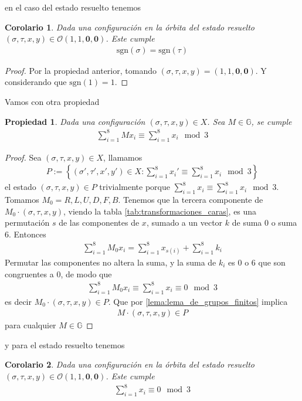 \documentclass{article}
\newtheorem{propiedad}{Propiedad}[section]
\newtheorem{corolario}{Corolario}[section]
\theoremstyle{definition}
\newcommand{\G}{\mathbb{G}}
\newcommand{\sgn}[1]{\text{sgn}\left(#1\right)}
\begin{document}
en el caso del estado resuelto tenemos
\begin{corolario}
    Dada una configuración en la órbita del estado resuelto $(\sigma,\tau,x,y)\in \mathcal{O}(1,1,\mathbf{0},\mathbf{0})$. Este cumple
    \begin{align*}
        \sgn{\sigma}=\sgn{\tau}
    \end{align*}
\end{corolario}
\begin{proof}
    Por la propiedad anterior, tomando $(\sigma,\tau,x,y)=(1,1,\mathbf{0},\mathbf{0})$. Y considerando que $\sgn{1}=1$.
\end{proof}
Vamos con otra propiedad
\begin{propiedad}
    Dada una configuración $(\sigma,\tau,x,y)\in X$. Sea $M\in \G$, se cumple
    \begin{align*}
        \sum_{i=1}^8 M x_i\equiv \sum_{i=1}^8 x_i\mod 3
    \end{align*}
\end{propiedad}
\begin{proof}
    Sea $(\sigma,\tau,x,y)\in X$, llamamos
    \begin{align*}
        P:=\left\{(\sigma',\tau',x',y')\in X: \sum_{i=1}^8 x_i'\equiv \sum_{i=1}^8 x_i \mod 3\right\}
    \end{align*}
    el estado $(\sigma,\tau,x,y)\in P$ trivialmente porque $\sum_{i=1}^8 x_i\equiv \sum_{i=1}^8 x_i\mod{3}$. Tomamos $M_0=R,L,U,D,F,B$. Tenemos que la tercera componente de $M_0\cdot (\sigma,\tau,x,y)$, viendo la tabla \ref{tab:transformaciones_caras}, es una permutación $s$ de las componentes de $x$, sumado a un vector $k$ de suma $0$ o suma $6$. Entonces
    \begin{align*}
        \sum_{i=1}^8 M_0x_i=\sum_{i=1}^8 x_{s(i)}+\sum_{i=1}^8 k_i
    \end{align*}
    Permutar las componentes no altera la suma, y la suma de $k_i$ es $0$ o $6$ que son congruentes a $0$, de modo que
    \begin{align*}
        \sum_{i=1}^8 M_0 x_i\equiv\sum_{i=1}^8x_i\equiv 0\mod 3
    \end{align*}
    es decir $M_0\cdot (\sigma,\tau,x,y)\in P$. Que por \ref{lema:lema_de_grupos_finitos} implica
    \begin{align*}
        M\cdot (\sigma,\tau,x,y)\in P
    \end{align*}
    para cualquier $M\in \G$
\end{proof}
y para el estado resuelto tenemos
\begin{corolario}
    Dada una configuración en la órbita del estado resuelto $(\sigma,\tau,x,y)\in \mathcal{O}(1,1,\mathbf{0},\mathbf{0})$. Este cumple
    \begin{align*}
        \sum_{i=1}^8 x_i\equiv 0\mod 3
    \end{align*}
\end{corolario}
\end{document}
